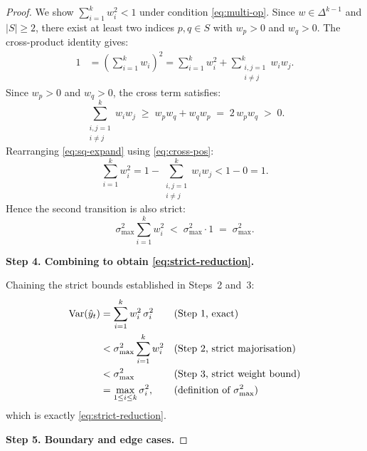 \documentclass[12pt,openany]{book}
\numberwithin{equation}{chapter}
\theoremstyle{plain}
\theoremstyle{definition}
\theoremstyle{remark}
\numberwithin{equation}{chapter}
\theoremstyle{plain}
\DeclareMathOperator{\Var}{Var}
\begin{document}
\begin{proof}
\noindent We show $\sum_{i=1}^{k} w_i^2 < 1$ under condition
\eqref{eq:multi-op}.  Since $w \in \Delta^{k-1}$ and $|S| \geq 2$,
there exist at least two indices $p, q \in S$ with $w_p > 0$ and
$w_q > 0$.  The cross-product identity gives:
\begin{align}
  1
    &= \left(\sum_{i=1}^{k} w_i\right)^{\!2}
     = \sum_{i=1}^{k} w_i^2
       + \sum_{\substack{i,j=1 \\ i \neq j}}^{k} w_i w_j.
  \label{eq:sq-expand}
\end{align}
Since $w_p > 0$ and $w_q > 0$, the cross term satisfies:
\begin{equation}
  \sum_{\substack{i,j=1 \\ i \neq j}}^{k} w_i w_j
    \;\geq\; w_p w_q + w_q w_p
    \;=\; 2\,w_p w_q
    \;>\; 0.
  \label{eq:cross-pos}
\end{equation}
Rearranging \eqref{eq:sq-expand} using \eqref{eq:cross-pos}:
\begin{equation}
  \sum_{i=1}^{k} w_i^2
    = 1 - \sum_{\substack{i,j=1 \\ i \neq j}}^{k} w_i w_j
    < 1 - 0
    = 1.
  \label{eq:sum-sq-strict}
\end{equation}
Hence the second transition is also strict:
\begin{equation}
  \sigma_{\max}^2 \sum_{i=1}^{k} w_i^2
    \;<\;
    \sigma_{\max}^2 \cdot 1
    \;=\; \sigma_{\max}^2.
\end{equation}

\medskip
\noindent\textbf{Step 4. Combining to obtain \eqref{eq:strict-reduction}.}

\noindent Chaining the strict bounds established in Steps~2 and~3:
\begin{align}
  \Var(\hat{y}_t)
    &= \sum_{i=1}^{k} w_i^2\,\sigma_i^2
     && \text{(Step 1, exact)} \notag \\
    &< \sigma_{\max}^2 \sum_{i=1}^{k} w_i^2
     && \text{(Step 2, strict majorisation)} \notag \\
    &< \sigma_{\max}^2
     && \text{(Step 3, strict weight bound)} \notag \\
    &= \max_{1 \leq i \leq k}\sigma_i^2,
     && \text{(definition of $\sigma_{\max}^2$)}
\end{align}
which is exactly \eqref{eq:strict-reduction}.

\medskip
\noindent\textbf{Step 5. Boundary and edge cases.}


\end{proof}
\end{document}
